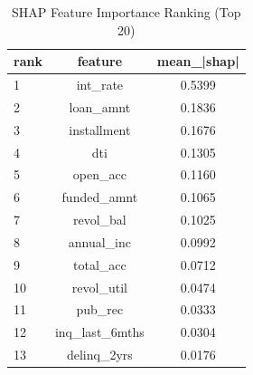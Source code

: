 \begin{table}
\centering
\caption{SHAP Feature Importance Ranking (Top 20)}
\label{tab:shap_ranking}
\begin{tabular}{lcc}
\toprule
rank & feature & mean_|shap| \\
\midrule
1 & int_rate & 0.5399 \\
2 & loan_amnt & 0.1836 \\
3 & installment & 0.1676 \\
4 & dti & 0.1305 \\
5 & open_acc & 0.1160 \\
6 & funded_amnt & 0.1065 \\
7 & revol_bal & 0.1025 \\
8 & annual_inc & 0.0992 \\
9 & total_acc & 0.0712 \\
10 & revol_util & 0.0474 \\
11 & pub_rec & 0.0333 \\
12 & inq_last_6mths & 0.0304 \\
13 & delinq_2yrs & 0.0176 \\
\bottomrule
\end{tabular}
\end{table}
